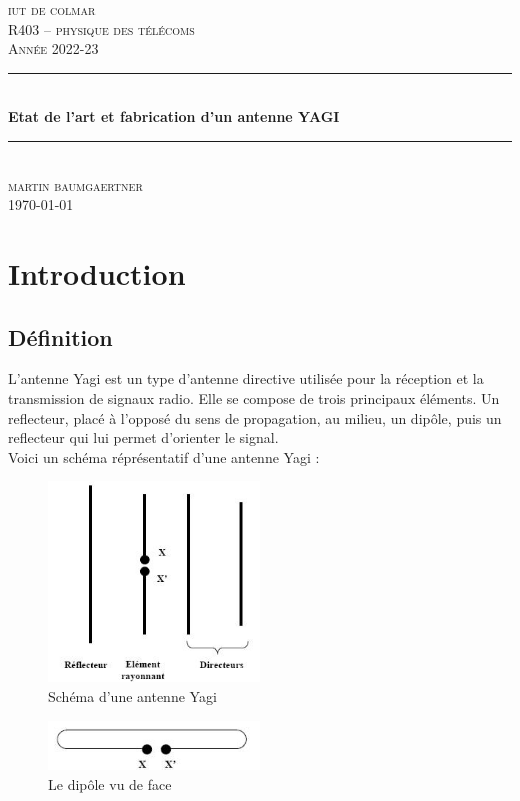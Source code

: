 \documentclass[12pt, a4paper]{article}
\begin{document}
\begin{titlepage}
	\newcommand{\HRule}{\rule{\linewidth}{0.5mm}} 
	\center 
	\textsc{\LARGE iut de colmar}\\[6.5cm] 
	\textsc{\Large R403 -- physique des télécoms}\\[0.5cm] 
	\textsc{\large Année 2022-23}\\[0.5cm]
	\HRule\\[0.75cm]
	{\Large\bfseries Etat de l'art et fabrication d'un antenne YAGI}\\[0.4cm]
	\HRule\\[1.5cm]
	\textsc{\large martin baumgaertner}\\[6cm] 

	\vfill\vfill\vfill
	{\large\today} 
	\vfill
\end{titlepage}
\newpage
\tableofcontents
\listoffigures
\newpage
\section{Introduction}
\subsection{Définition}
L'antenne Yagi est un type d'antenne directive utilisée 
pour la réception et la transmission de signaux radio. 
Elle se compose de trois principaux éléments. Un reflecteur,
placé à l'opposé du sens de propagation, au milieu, 
un dipôle, puis un reflecteur qui lui permet d'orienter
le signal.\\

Voici un schéma réprésentatif d'une antenne Yagi :
\begin{figure}[h]
    \centering
    \includegraphics[width=0.5\textwidth]{img/yagi.jpg}
    \caption{Schéma d'une antenne Yagi \cite{r1}}
    \label{fig:yagi}
\end{figure}

\begin{figure}[h]
    \centering
    \includegraphics[width=0.5\textwidth]{img/trombone-yagi.jpg}
    \caption{Le dipôle vu de face \cite{r1}}
    \label{fig:yagi-de-face}
\end{figure}
\end{document}
